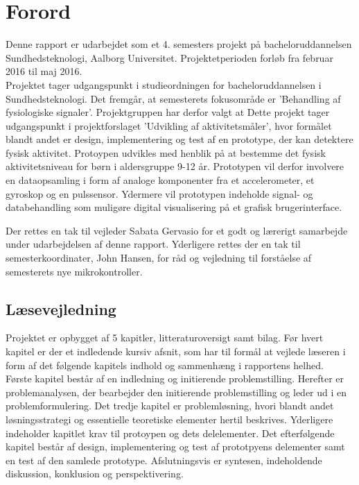 \chapter*{Forord}
Denne rapport er udarbejdet som et 4. semesters projekt på bacheloruddannelsen Sundhedsteknologi, Aalborg Universitet. Projektetperioden forløb fra februar 2016 til maj 2016. \\
Projektet tager udgangspunkt i studieordningen for bacheloruddannelsen i Sundhedsteknologi. Det fremgår, at semesterets fokusområde er 'Behandling af fysiologiske signaler'. Projektgruppen har derfor valgt at 
Dette projekt tager udgangspunkt i projektforslaget 'Udvikling af aktivitetsmåler', hvor formålet blandt andet er design, implementering og test af en prototype, der kan detektere fysisk aktivitet. Protoypen udvikles med henblik på at bestemme det fysisk aktivitetsniveau for børn i aldersgruppe 9-12 år. Prototypen vil derfor involvere en dataopsamling i form af analoge komponenter fra et accelerometer, et gyroskop og en pulssensor. Ydermere vil prototypen indeholde signal- og databehandling som muligøre digital visualisering på et grafisk brugerinterface.

Der rettes en tak til vejleder Sabata Gervasio for et godt og lærerigt samarbejde under udarbejdelsen af denne rapport. Yderligere rettes der en tak til semesterkoordinater, John Hansen, for råd og vejledning til forståelse af semesterets nye mikrokontroller. 

\section*{Læsevejledning}
Projektet er opbygget af 5 kapitler, litteraturoversigt samt bilag. Før hvert kapitel er der et indledende kursiv afsnit, som har til formål at vejlede læseren i form af det følgende kapitels indhold og sammenhæng i rapportens helhed.\\
Første kapitel består af en indledning og initierende problemstilling. Herefter er problemanalysen, der bearbejder den initierende problemstilling og leder ud i en problemformulering. Det tredje kapitel er problemløsning, hvori blandt andet løsningsstrategi og essentielle teoretiske elementer hertil beskrives. Yderligere indeholder kapitlet krav til protoypen og dets delelementer. Det efterfølgende kapitel består af design, implementering og test af prototpyens delementer samt en test af den samlede prototype. Afslutningsvis er syntesen, indeholdende diskussion, konklusion og perspektivering.

